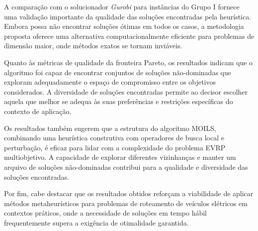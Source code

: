 A comparação com o solucionador \textit{Gurobi} para instâncias do Grupo I fornece uma validação importante da qualidade das soluções encontradas pela heurística. Embora possa não encontrar soluções ótimas em todos os casos, a metodologia proposta oferece uma alternativa computacionalmente eficiente para problemas de dimensão maior, onde métodos exatos se tornam inviáveis.

Quanto às métricas de qualidade da fronteira Pareto, os resultados indicam que o algoritmo foi capaz de encontrar conjuntos de soluções não-dominadas que exploram adequadamente o espaço de compromisso entre os objetivos considerados. A diversidade de soluções encontradas permite ao decisor escolher aquela que melhor se adequa às suas preferências e restrições específicas do contexto de aplicação.

Os resultados também sugerem que a estrutura do algoritmo MOILS, combinando uma heurística construtiva com operadores de busca local e perturbação, é eficaz para lidar com a complexidade do problema EVRP multiobjetivo. A capacidade de explorar diferentes vizinhanças e manter um arquivo de soluções não-dominadas contribui para a qualidade e diversidade das soluções encontradas.

Por fim, cabe destacar que os resultados obtidos reforçam a viabilidade de aplicar métodos metaheurísticos para problemas de roteamento de veículos elétricos em contextos práticos, onde a necessidade de soluções em tempo hábil frequentemente supera a exigência de otimalidade garantida.

